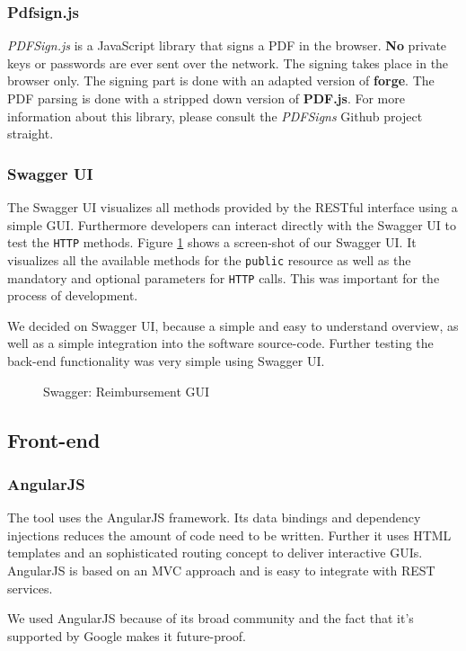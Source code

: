 \subsubsection{Pdfsign.js}
\label{tec:pdfsign}
\textit{PDFSign.js} is a JavaScript library that signs a PDF in the browser. \textbf{No} private keys or passwords are ever sent over the network. The signing takes place in the browser only. The signing part is done with an adapted version of \textbf{forge}. The PDF parsing is done with a stripped down version of \textbf{PDF.js}. For more information about this library, please consult the \textit{PDFSigns} Github project \cite{pdfsign} straight. 

\subsubsection{Swagger UI}

The Swagger UI visualizes all methods provided by the RESTful interface using a simple GUI. Furthermore developers can interact directly with the Swagger UI to test the \texttt{HTTP} methods. Figure \ref{fig:swagger01} shows a screen-shot of our Swagger UI. It visualizes all the available methods for the \texttt{public} resource as well as the mandatory and optional parameters for \texttt{HTTP} calls. This was important for the process of development. \cite{swagger} \par
We decided on Swagger UI, because a simple and easy to understand overview, as well as a simple integration into the software source-code. Further testing the back-end functionality was very simple using Swagger UI.

\begin{figure}[H]
	\centering
	\caption{Swagger: Reimbursement GUI}
	\label{fig:swagger01}
\end{figure}

\subsection{Front-end}

\subsubsection{AngularJS}
The tool uses the AngularJS framework. Its data bindings and dependency injections reduces the amount of code need to be written. Further it uses HTML templates and an sophisticated routing concept to deliver interactive GUIs. AngularJS is based on an MVC approach and is easy to integrate with REST services.\cite{angular}\par
We used AngularJS because of its broad community and the fact that it's supported by Google makes it future-proof.

